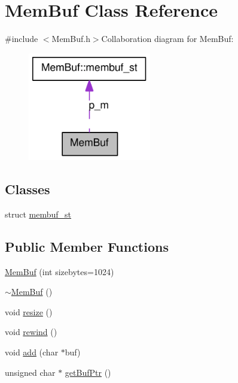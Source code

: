 \hypertarget{classMemBuf}{
\section{MemBuf Class Reference}
\label{classMemBuf}
}


{\ttfamily \#include $<$MemBuf.h$>$}Collaboration diagram for MemBuf:\nopagebreak
\begin{figure}[H]
\begin{center}
\leavevmode
\includegraphics[width=152pt]{classMemBuf__coll__graph}
\end{center}
\end{figure}
\subsection*{Classes}
\begin{DoxyCompactItemize}
\item 
struct \hyperlink{structMemBuf_1_1membuf__st}{membuf\_\-st}
\end{DoxyCompactItemize}
\subsection*{Public Member Functions}
\begin{DoxyCompactItemize}
\item 
\hyperlink{classMemBuf_ae5cd261b2167fdb718e795ecee5e131d}{MemBuf} (int sizebytes=1024)
\item 
\hyperlink{classMemBuf_a84884d61f69e047814a365e8f0053829}{$\sim$MemBuf} ()
\item 
void \hyperlink{classMemBuf_a4cb3b44d88059c382184ca7d1aa1f235}{resize} ()
\item 
void \hyperlink{classMemBuf_acecce3962e522cdcabba571ffd51f940}{rewind} ()
\item 
void \hyperlink{classMemBuf_a98a5b5de27fb73dd3433773b825faf21}{add} (char $\ast$buf)
\item 
unsigned char $\ast$ \hyperlink{classMemBuf_a910edfa13107da037c7ccfc80adc0243}{getBufPtr} ()
\end{DoxyCompactItemize}
